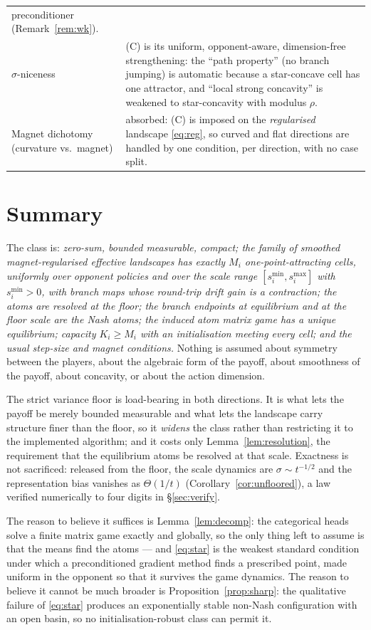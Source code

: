 \documentclass[11pt]{article}
\theoremstyle{definition}
\begin{document}
\begin{center}
\begin{tabular}{p{} p{}}
  preconditioner (Remark~\ref{rem:wk}).\\
$\sigma$-niceness & (C) is its uniform, opponent-aware, dimension-free
  strengthening: the ``path property'' (no branch jumping) is automatic because a
  star-concave cell has one attractor, and ``local strong concavity'' is
  weakened to star-concavity with modulus $\rho$.\\
Magnet dichotomy (curvature vs.\ magnet) & absorbed: (C) is imposed on the
  \emph{regularised} landscape \eqref{eq:reg}, so curved and flat directions are
  handled by one condition, per direction, with no case split.\\
\hline
\end{tabular}
\end{center}

\section{Summary}

The class is: \emph{zero-sum, bounded measurable, compact; the family of smoothed
magnet-regularised effective landscapes has exactly $M_i$ one-point-attracting
cells, uniformly over opponent policies and over the scale range
$[s^{\min}_i, s^{\max}_i]$ with $s^{\min}_i > 0$, with branch maps whose
round-trip drift gain is a contraction; the atoms are resolved at the floor; the
branch endpoints at equilibrium and at the floor scale are the Nash atoms; the
induced atom matrix game has a unique equilibrium; capacity $K_i \ge M_i$ with an
initialisation meeting every cell; and the usual step-size and magnet
conditions.} Nothing is assumed about symmetry between the players, about the
algebraic form of the payoff, about smoothness of the payoff, about concavity, or
about the action dimension.

The strict variance floor is load-bearing in both directions. It is what lets the
payoff be merely bounded measurable and what lets the landscape carry structure
finer than the floor, so it \emph{widens} the class rather than restricting it to
the implemented algorithm; and it costs only Lemma~\ref{lem:resolution}, the requirement that
the equilibrium atoms be resolved at that scale. Exactness is not sacrificed:
released from the floor, the scale dynamics are $\sigma \sim t^{-1/2}$ and the
representation bias vanishes as $\Theta(1/t)$
(Corollary~\ref{cor:unfloored}), a law verified numerically to four digits in
\S\ref{sec:verify}.

The reason to believe it suffices is Lemma~\ref{lem:decomp}: the categorical
heads solve a finite matrix game exactly and globally, so the only thing left to
assume is that the means find the atoms --- and \eqref{eq:star} is the weakest
standard condition under which a preconditioned gradient method finds a
prescribed point, made uniform in the opponent so that it survives the game
dynamics. The reason to believe it cannot be much broader is
Proposition~\ref{prop:sharp}: the qualitative failure of \eqref{eq:star} produces
an exponentially stable non-Nash configuration with an open basin, so no
initialisation-robust class can permit it.
\end{document}
